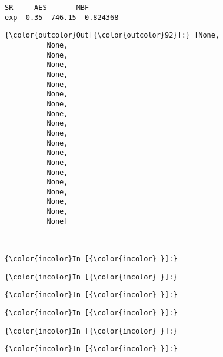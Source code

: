 \documentclass[11pt]{article}
\begin{document}
    \begin{Verbatim}[commandchars=\\\{\}]
       SR     AES       MBF
exp  0.35  746.15  0.824368

    \end{Verbatim}

            \begin{Verbatim}[commandchars=\\\{\}]
{\color{outcolor}Out[{\color{outcolor}92}]:} [None,
          None,
          None,
          None,
          None,
          None,
          None,
          None,
          None,
          None,
          None,
          None,
          None,
          None,
          None,
          None,
          None,
          None,
          None,
          None]
\end{Verbatim}
        
    \begin{center}
    \end{center}
    { \hspace*{\fill} \\}
    
    \begin{Verbatim}[commandchars=\\\{\}]
{\color{incolor}In [{\color{incolor} }]:} 
\end{Verbatim}

    \begin{Verbatim}[commandchars=\\\{\}]
{\color{incolor}In [{\color{incolor} }]:} 
\end{Verbatim}

    \begin{Verbatim}[commandchars=\\\{\}]
{\color{incolor}In [{\color{incolor} }]:} 
\end{Verbatim}

    \begin{Verbatim}[commandchars=\\\{\}]
{\color{incolor}In [{\color{incolor} }]:} 
\end{Verbatim}

    \begin{Verbatim}[commandchars=\\\{\}]
{\color{incolor}In [{\color{incolor} }]:} 
\end{Verbatim}

    \begin{Verbatim}[commandchars=\\\{\}]
{\color{incolor}In [{\color{incolor} }]:} 
\end{Verbatim}
\end{document}
